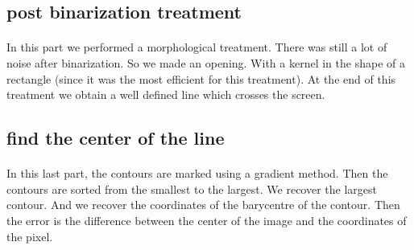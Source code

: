 \subsection{post binarization treatment}
\paragraph{}
In this part we performed a morphological treatment. There was still a lot of noise after binarization. So we made an opening. 
With a kernel in the shape of a rectangle (since it was the most efficient for this treatment).
At the end of this treatment we obtain a well defined line which crosses the screen.

\subsection{find the center of the line}
\paragraph{}
In this last part, the contours are marked using a gradient method. Then the contours are sorted from the smallest to the largest.
We recover the largest contour.
And we recover the coordinates of the barycentre of the contour.
Then the error is the difference between the center of the image and the coordinates of the pixel.
